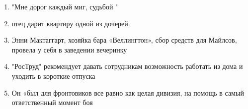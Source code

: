 \documentclass[paper=a4, fontsize=11pt]{scrartcl}
\begin{document}
\begin{enumerate}
    \item "Мне дорог каждый миг, \raisebox{-\baselineskip}{\shortstack{\underline{\hspace{5cm}}\\lahjoittama}} судьбой "
    \item  \raisebox{-\baselineskip}{\shortstack{\underline{\hspace{5cm}}\\juova}} отец дарит квартиру одной из дочерей.
    \item Энни Мактаггарт, хозяйка бара «Веллингтон»,  сбор средств для Майлсов, провела у себя в заведении вечеринку
    \item "РосТруд" рекомендует давать сотрудникам возможность работать из дома и уходить в короткие  отпуска
    \item Он «был для фронтовиков все равно как целая дивизия, \raisebox{-\baselineskip}{\shortstack{\underline{\hspace{5cm}}\\saapunut}} на помощь в самый ответственный момент боя
\end{enumerate}
\end{document}
